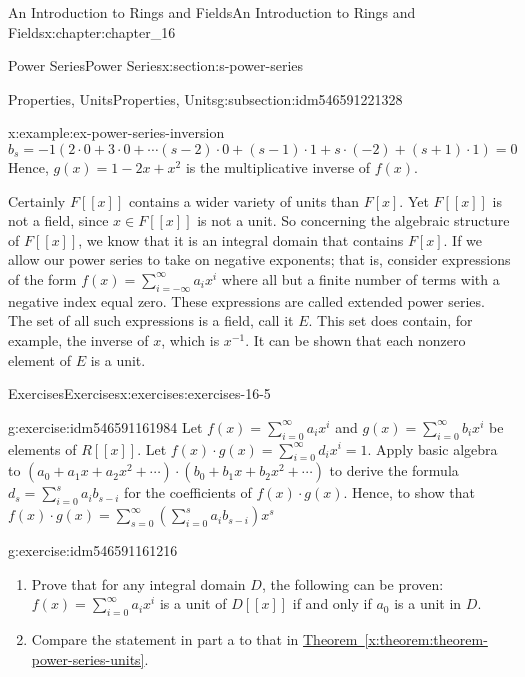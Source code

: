 \documentclass[oneside,10pt,]{book}
\newcommand{\xreffont}{\relax}
\numberwithin{equation}{section}
\begin{document}
\begin{chapterptx}{An Introduction to Rings and Fields}{}{An Introduction to Rings and Fields}{}{}{x:chapter:chapter_16}
\begin{sectionptx}{Power Series}{}{Power Series}{}{}{x:section:s-power-series}
\begin{subsectionptx}{Properties, Units}{}{Properties, Units}{}{}{g:subsection:idm546591221328}
\begin{example}{}{x:example:ex-power-series-inversion}
\begin{equation*}
b_s= -1(2\cdot 0 + 3\cdot 0+\cdots (s-2)\cdot 0+(s-1)\cdot 1+s\cdot (-2)+(s+1)\cdot 1)=0
\end{equation*}
Hence, \(g(x) = 1 - 2x +x^2\) is the multiplicative inverse of \(f(x)\).%
\end{example}
Certainly \(F[[x]]\) contains a wider variety of units than \(F[x]\). Yet \(F[[x]]\) is not a field, since \(x\in  F[[x]]\) is not a unit. So concerning the algebraic structure of \(F[[x]]\), we know that it is an integral domain that contains \(F[x]\). If we allow our power series to take on negative exponents; that is, consider expressions of the form \(f(x) =\sum_{i=-\infty }^{\infty } a_i x^i\) where all but a finite number of terms with a negative index equal zero.  These expressions are called extended power series. The set of all such expressions is a field, call it \(E\). This set does contain, for example, the inverse of \(x\), which is \(x^{-1}\). It can be shown that each nonzero element of \(E\) is a unit.%
\end{subsectionptx}
%
%
\typeout{************************************************}
\typeout{************************************************}
%
\begin{exercises-subsection}{Exercises}{}{Exercises}{}{}{x:exercises:exercises-16-5}
\begin{divisionexercise}{1}{}{}{g:exercise:idm546591161984}%
Let \(f(x)=\sum_{i=0}^{\infty} a_i x^i\)  and  \(g(x)=\sum_{i=0}^{\infty } b_i x^i\) be elements of \(R[[x]]\).  Let  \(f(x) \cdot  g(x) =\sum_{i=0}^{\infty } d_i x^i= 1\).   Apply basic algebra to \(\left(a_0 + a_1 x+a_2 x^2+ \cdots \right)\cdot \left(b_0 + b_1 x+b_2 x^2+ \cdots \right)\) to derive the formula \(d_s= \sum_{i=0}^s a_i b_{s-i}\) for the coefficients of \(f(x) \cdot  g(x)\). Hence, to show that \(f(x) \cdot  g(x) =\sum_{s=0}^{\infty } \left(\sum_{i=0}^s a_i b_{s-i}\right) x^s\)%
\end{divisionexercise}%
\begin{divisionexercise}{2}{}{}{g:exercise:idm546591161216}%
%
\begin{enumerate}[label=(\alph*)]
\item{}Prove that for any integral domain \(D\), the following can be proven: \(f(x)=\sum_{i=0}^{\infty } a_i x^i\) is a unit of \(D[[x]]\) if and only if \(a_0\) is a unit in \(D\).%
\item{}Compare the statement in part a to that in \hyperref[x:theorem:theorem-power-series-units]{Theorem~{\xreffont\ref{x:theorem:theorem-power-series-units}}}.%

\end{enumerate}
\end{divisionexercise}
\end{exercises-subsection}
\end{sectionptx}
\end{chapterptx}
\end{document}
